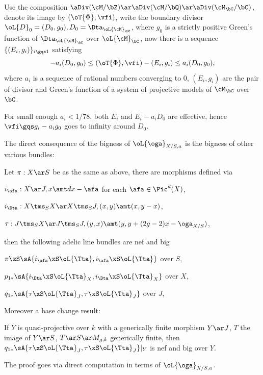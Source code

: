 \documentclass[a4paper, twoside]{article}
\begin{document}
\begin{prf}
	Use the composition $\aDiv(\cM/\bZ)\ar\aDiv(\cM/\bQ)\ar\aDiv(\cM_{\bC}/\bC)$, denote its image by $(\oT{\Phi},\vfi)$, write the boundary divisor $\oL{D}_{0}=(D_{0},g_{0}), D_{0}=\Dta_{\oL{\cM}_{\bC}}$, where $g_{0}$ is a strictly positive Green's function of $\Dta_{\oL{\cM}_{\bC}}$ over $\oL{\cM}_{\bC}$, now there is a sequence $\{(E_{i},g_{i})\}_{i\gqs1}$ satisfying
	\[
		-a_{i}(D_{0},g_{0})\leq(\oT{\Phi},\vfi)-(E_{i},g_{i})\leq a_{i}(D_{0},g_{0}),
	\]
	where $a_{i}$ is a sequence of rational numbers converging to $0$, $(E_{i},g_{i})$ are the pair of divisor and Green's function of a system of projective models of $\cM_{\bC}$ over $\bC$.

	For small enough $a_{i}<1/78$, both $E_{i}$ and $E_{i}-a_{i}D_{0}$ are effective, hence $\vfi\gqs g_{i}-a_{i}g_{0}$ goes to infinity around $D_{0}$.
\end{prf}


The direct consequence of the bigness of $\oL{\oga}_{X/S,a}$ is the bigness of other various bundles:

\begin{thm}
	Let $\pi:X\ar S$ be as the same as above, there are morphisms defined via
	\begin{enr}
		\item $i_{\afa}:X\ar J, x\amt dx-\afa$ for each $\afa\in\Pic^{d}(X)$,
		\item $i_{\Dta}:X\tms_{S}X\ar X\tms_{S}J, (x,y)\amt (x,y-x)$,
		\item $\tau:J\tms_{S}X\ar J\tms_{S}J, (y,x)\amt(y,y+(2g-2)x-\oga_{X/S})$,
	\end{enr}
	then the following adelic line bundles are nef and big
	\begin{enr}
		\item $\pi\zS\sA{i_{\afa}\xS\oL{\Tta},i_{\afa}\xS\oL{\Tta}}$ over $S$,
		\item $p_{1*}\sA{i_{\Dta}\xS\oL{\Tta}_{X},i_{\Dta}\xS\oL{\Tta}_{X}}$ over $X$,
		\item $q_{1*}\sA{\tau\xS\oL{\Tta}_{J},\tau\xS\oL{\Tta}_{J}}$ over $J$,
	\end{enr}
	Moreover a base change result:

	If $Y$ is quasi-projective over $k$ with a generically finite morphism $Y\ar J$, $T$ the image of $Y\ar S$, $T\ar S\ar M_{g,k}$ generically finite, then $q_{1*}\sA{\tau\xS\oL{\Tta}_{J},\tau\xS\oL{\Tta}_{J}}|_{Y}$ is nef and big over $Y$.
\end{thm}
\begin{rmk}
	The proof goes via direct computation in terms of $\oL{\oga}_{X/S,a}$.
\end{rmk}
\end{document}
